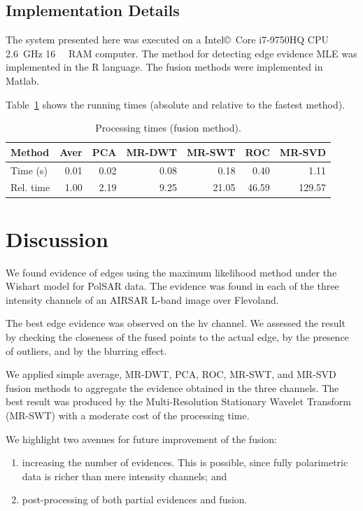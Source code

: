 \documentclass[journal]{IEEEtran}
\begin{document}
\subsection{Implementation Details}

The system presented here was executed on a Intel\copyright\ Core i7-9750HQ CPU \SI{2.6}{\giga\hertz} \SI{16}{\giga\byte} RAM computer.  
The method for detecting edge evidence MLE was implemented in the R language.
The fusion methods were implemented in Matlab. 

Table~\ref{metrica_de_tempo} shows the running times (absolute and relative to the fastest method).

\begin{table}[hbt]
	\centering
	\caption{Processing times (fusion method).}\label{metrica_de_tempo}
	\begin{tabular}{@{}lrrrrrr@{}} \toprule
		Method       & Aver   &   PCA      &  MR-DWT  & MR-SWT &  ROC  &  MR-SVD \\ \midrule
		Time (s)      & 0.01      & 0.02       &  0.08 & 0.18      &  0.40       & 1.11  \\
		Rel. time     & 1.00      & 2.19       &  9.25 & 21.05     &  46.59      & 129.57  \\ \bottomrule
	\end{tabular}
\end{table}

\section{Discussion}\label{sec_06}

We found evidence of edges using the maximum likelihood method under the Wishart model for PolSAR data. 
The evidence was found in each of the three intensity channels of an AIRSAR L-band image over Flevoland.

The best edge evidence was observed on the hv channel. We assessed the result by checking the closeness of the fused points to the actual edge, by the presence of outliers, and by the blurring effect.

We applied simple average, MR-DWT, PCA, ROC, MR-SWT, and MR-SVD fusion methods to aggregate the evidence obtained in the three channels.
The best result was produced by the Multi-Resolution Stationary Wavelet Transform (MR-SWT) with a moderate cost of the processing time.

We highlight two avenues for future improvement of the fusion:
\begin{enumerate}
	\item increasing the number of evidences.
	This is possible, since fully polarimetric data is richer than mere intensity channels; and
	\item post-processing of both partial evidences and fusion.
\end{enumerate}



\end{document}

